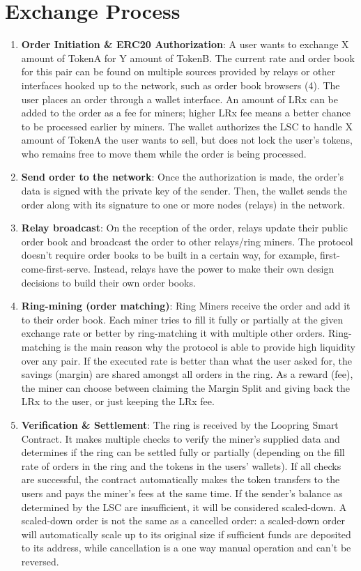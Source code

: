 \documentclass[UTF8,nofonts]{article}
\begin{document}
\section{Exchange Process}
\begin{enumerate} 

\item \textbf{Order Initiation \& ERC20 Authorization}: A user wants to exchange X amount of TokenA for Y amount of TokenB. The current rate and order book for this pair can be found on multiple sources provided by relays or other interfaces hooked up to the network, such as order book browsers (4). The user places an order through a wallet interface. An amount of LRx can be added to the order as a fee for miners; higher LRx fee means a better chance to be processed earlier by miners. The wallet authorizes the LSC to handle X amount of TokenA the user wants to sell, but does not lock the user's tokens, who remains free to move them while the order is being processed.

\item \textbf{Send order to the network}: Once the authorization is made, the order's data is signed with the private key of the sender. Then, the wallet sends the order along with its signature to one or more nodes (relays) in the network.
\item \textbf{Relay broadcast}: On the reception of the order, relays update their public order book and broadcast the order to other relays/ring miners. The protocol doesn’t require order books to be built in a certain way, for example, first-come-first-serve. Instead, relays have the power to make their own design decisions to build their own order books.
\item \textbf{Ring-mining (order matching)}: Ring Miners receive the order and add it to their order book. Each miner tries to fill it fully or partially at the given exchange rate or better by ring-matching it with multiple other orders. Ring-matching is the main reason why the protocol is able to provide high liquidity over any pair. If the executed rate is better than what the user asked for, the savings (margin) are shared amongst all orders in the ring. As a reward (fee), the miner can choose between claiming the Margin Split and giving back the LRx to the user, or just keeping the LRx fee.
\item \textbf{Verification \& Settlement}: The ring is received by the Loopring Smart Contract. It makes multiple checks to verify the miner's supplied data and determines if the ring can be settled fully or partially (depending on the fill rate of orders in the ring and the tokens in the users' wallets). If all checks are successful, the contract automatically makes the token transfers to the users and pays the miner's fees at the same time. If the sender's balance as determined by the LSC are insufficient, it will be considered scaled-down. A scaled-down order is not the same as a cancelled order: a scaled-down order will automatically scale up to its original size if sufficient funds are deposited to its address, while cancellation is a one way manual operation and can’t be reversed.

\end{enumerate}
\end{document}
